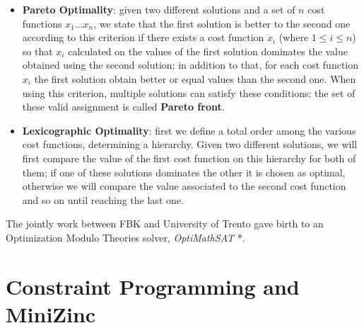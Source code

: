 \begin{itemize}
    \item \textbf{Pareto Optimality}: given two different solutions and a set of $n$ cost functions $x_1...x_n$, we state that the first solution is better to the second one according to this criterion if there exists a cost function $x_i$ (where $1\leq i\leq n$) so that $x_i$ calculated on the values of the first solution dominates the value obtained using the second solution; in addition to that, for each cost function $x_i$ the first solution obtain better or equal values than the second one. When using this criterion, multiple solutions can satisfy these conditions: the set of these valid assignment is called \textbf{Pareto front}.
    \item \textbf{Lexicographic Optimality}: first we define a total order among the various cost functions, determining  a hierarchy. Given two different solutions, we will first compare the value of the first cost function on this hierarchy for both of them; if one of these solutions dominates the other it is chosen as optimal, otherwise we will compare the value associated to the second cost function and so on until reaching the last one.
\end{itemize}

The jointly work between FBK and University of Trento gave birth to an Optimization Modulo Theories solver, \textit{OptiMathSAT} \cite{pa25}*.

\section{Constraint Programming and MiniZinc}

